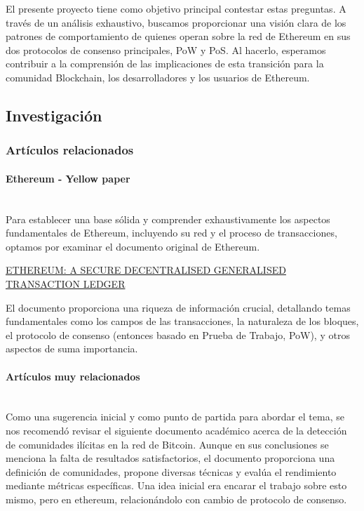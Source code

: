 \documentclass{article}
\begin{document}
El presente proyecto tiene como objetivo principal contestar estas preguntas. A través de un análisis exhaustivo, buscamos proporcionar una visión clara de los patrones de comportamiento de quienes operan sobre la red de Ethereum en sus dos protocolos de consenso principales, PoW y PoS. Al hacerlo, esperamos contribuir a la comprensión de las implicaciones de esta transición para la comunidad Blockchain, los desarrolladores y los usuarios de Ethereum.


\subsection{Investigación}

\subsubsection{Artículos relacionados}

\paragraph{Ethereum - Yellow paper } \mbox{}\\
Para establecer una base sólida y comprender exhaustivamente los aspectos fundamentales de Ethereum, incluyendo su red y el proceso de transacciones, optamos por examinar el documento original de Ethereum. \newline

\href{https://ethereum.github.io/yellowpaper/paper.pdf}{ETHEREUM: A SECURE DECENTRALISED GENERALISED TRANSACTION LEDGER}

El documento proporciona una riqueza de información crucial, detallando temas fundamentales como los campos de las transacciones, la naturaleza de los bloques, el protocolo de consenso (entonces basado en Prueba de Trabajo, PoW), y otros aspectos de suma importancia.

\paragraph{Artículos muy relacionados}\mbox{}\\

Como una sugerencia inicial y como punto de partida para abordar el tema, se nos recomendó revisar el siguiente documento académico acerca de la detección de comunidades ilícitas en la red de Bitcoin. Aunque en sus conclusiones se menciona la falta de resultados satisfactorios, el documento proporciona una definición de comunidades, propone diversas técnicas y evalúa el rendimiento mediante métricas específicas.
Una idea inicial era encarar el trabajo sobre esto mismo, pero en ethereum, relacionándolo con cambio de protocolo de consenso.
\newline
\end{document}

